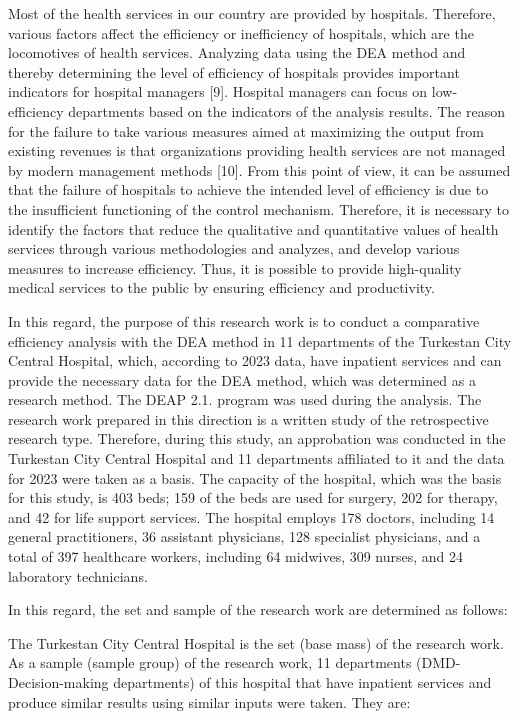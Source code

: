 \begin{multicols}{2}
Most of the health services in our country are provided by hospitals.
Therefore, various factors affect the efficiency or inefficiency of
hospitals, which are the locomotives of health services. Analyzing data
using the DEA method and thereby determining the level of efficiency of
hospitals provides important indicators for hospital managers {[}9{]}.
Hospital managers can focus on low-efficiency departments based on the
indicators of the analysis results. The reason for the failure to take
various measures aimed at maximizing the output from existing revenues
is that organizations providing health services are not managed by
modern management methods {[}10{]}. From this point of view, it can be
assumed that the failure of hospitals to achieve the intended level of
efficiency is due to the insufficient functioning of the control
mechanism. Therefore, it is necessary to identify the factors that
reduce the qualitative and quantitative values
\hspace{0pt}\hspace{0pt}of health services through various methodologies
and analyzes, and develop various measures to increase efficiency. Thus,
it is possible to provide high-quality medical services to the public by
ensuring efficiency and productivity.

In this regard, the purpose of this research work is to conduct a
comparative efficiency analysis with the DEA method in 11 departments of
the Turkestan City Central Hospital, which, according to 2023 data, have
inpatient services and can provide the necessary data for the DEA
method, which was determined as a research method. The DEAP 2.1. program
was used during the analysis. The research work prepared in this
direction is a written study of the retrospective research type.
Therefore, during this study, an approbation was conducted in the
Turkestan City Central Hospital and 11 departments affiliated to it and
the data for 2023 were taken as a basis. The capacity of the hospital,
which was the basis for this study, is 403 beds; 159 of the beds are
used for surgery, 202 for therapy, and 42 for life support services. The
hospital employs 178 doctors, including 14 general practitioners, 36
assistant physicians, 128 specialist physicians, and a total of 397
healthcare workers, including 64 midwives, 309 nurses, and 24 laboratory
technicians.

In this regard, the set and sample of the research work are determined
as follows:

The Turkestan City Central Hospital is the set (base mass) of the
research work. As a sample (sample group) of the research work, 11
departments (DMD-Decision-making departments) of this hospital that have
inpatient services and produce similar results using similar inputs were
taken. They are:


\end{multicols}
